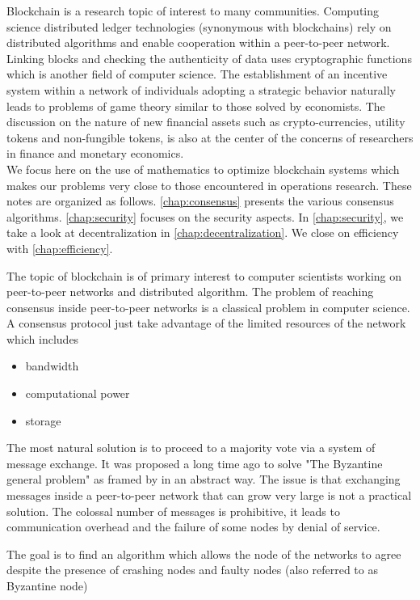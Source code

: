 \noindent Blockchain is a research topic of interest to many communities. Computing science distributed ledger technologies (synonymous with blockchains) rely on distributed algorithms and enable cooperation within a peer-to-peer network. Linking blocks and checking the authenticity of data uses cryptographic functions which is another field of computer science. The establishment of an incentive system within a network of individuals adopting a strategic behavior naturally leads to problems of game theory similar to those solved by economists. The discussion on the nature of new financial assets such as crypto-currencies, utility tokens and non-fungible tokens, is also at the center of the concerns of researchers in finance and monetary economics. \\

\noindent We focus here on the use of mathematics to optimize blockchain systems which makes our problems very close to those encountered in operations research. These notes are organized as follows. \cref{chap:consensus} presents the various consensus algorithms. \cref{chap:security} focuses on the security aspects. In \cref{chap:security}, we take a look at decentralization in \cref{chap:decentralization}. We close on efficiency with \cref{chap:efficiency}.



The topic of blockchain is of primary interest to computer scientists working on peer-to-peer networks and distributed algorithm. The problem of reaching consensus inside peer-to-peer networks is a classical problem in computer science. A consensus protocol just take advantage of the limited resources of the network which includes
\begin{itemize} 
	\item bandwidth
	\item computational power
	\item storage
\end{itemize}
The most natural solution is to proceed to a majority vote via a system of message exchange. It was proposed a long time ago to solve "The Byzantine general problem" as framed by \citet{lamport1982the} in an abstract way. The issue is that exchanging messages inside a peer-to-peer network that can grow very large is not a practical solution. The colossal number of messages is prohibitive, it leads to communication overhead and the failure of some nodes by denial of service.   

The goal is to find an algorithm which allows the node of the networks to agree despite the presence of crashing nodes and faulty nodes (also referred to as Byzantine node)

